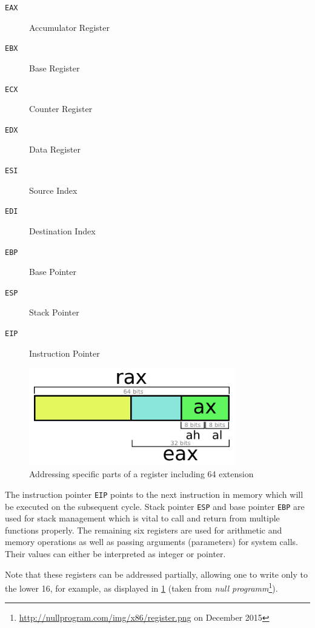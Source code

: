 \documentclass[article]{uibk}
\begin{document}
\begin{minipage}[t]{0.4\textwidth}
    \begin{description}
        \item[\texttt{EAX}] Accumulator Register
        \item[\texttt{EBX}] Base Register
        \item[\texttt{ECX}] Counter Register
        \item[\texttt{EDX}] Data Register
        \item[\texttt{ESI}] Source Index
        \item[\texttt{EDI}] Destination Index
        \item[\texttt{EBP}] Base Pointer
        \item[\texttt{ESP}] Stack Pointer
        \item[\texttt{EIP}] Instruction Pointer
    \end{description}
\end{minipage}
\begin{minipage}[t]{0.6\textwidth}
    \begin{figure}[H]
        \centering
        \includegraphics[width=0.8\textwidth]{gfx/single_register.png}
        \caption{Addressing specific parts of a register including \SI{64}{\bit} extension}
        \label{fig:single_register}
    \end{figure}
\end{minipage}
\bigskip

The instruction pointer \texttt{EIP} points to the next instruction in memory
which will be executed on the subsequent cycle. Stack pointer \texttt{ESP} and
base pointer \texttt{EBP} are used for stack management which is vital to call
and return from multiple functions properly. The remaining six registers are
used for arithmetic and memory operations as well as passing arguments
(parameters) for system calls. Their values can either be interpreted as
integer or pointer.

Note that these registers can be addressed partially, allowing one to write
only to the lower \SI{16}{\bit}, for example, as displayed in
\cref{fig:single_register} (taken from \textit{null
programm}\footnote{\url{http://nullprogram.com/img/x86/register.png} on
December 2015}).
\end{document}
